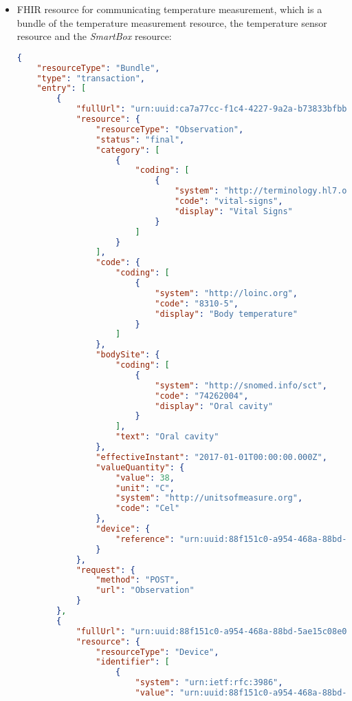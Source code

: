 \begin{itemize}
    \item \acs{FHIR} resource for communicating temperature measurement, which is a bundle of the temperature measurement resource, the temperature sensor resource and the \textit{SmartBox} resource:
    \begin{lstlisting}[language=json]   
{ 
    "resourceType": "Bundle", 
    "type": "transaction", 
    "entry": [ 
        { 
            "fullUrl": "urn:uuid:ca7a77cc-f1c4-4227-9a2a-b73833bfbb11",  
            "resource": { 
                "resourceType": "Observation", 
                "status": "final", 
                "category": [ 
                    { 
                        "coding": [ 
                            { 
                                "system": "http://terminology.hl7.org/CodeSystem/observation-category", 
                                "code": "vital-signs", 
                                "display": "Vital Signs" 
                            } 
                        ] 
                    } 
                ], 
                "code": { 
                    "coding": [ 
                        { 
                            "system": "http://loinc.org", 
                            "code": "8310-5", 
                            "display": "Body temperature" 
                        } 
                    ] 
                }, 
                "bodySite": { 
                    "coding": [ 
                        { 
                            "system": "http://snomed.info/sct", 
                            "code": "74262004", 
                            "display": "Oral cavity" 
                        } 
                    ], 
                    "text": "Oral cavity" 
                }, 
                "effectiveInstant": "2017-01-01T00:00:00.000Z", 
                "valueQuantity": { 
                    "value": 38, 
                    "unit": "C", 
                    "system": "http://unitsofmeasure.org", 
                    "code": "Cel" 
                }, 
                "device": { 
                    "reference": "urn:uuid:88f151c0-a954-468a-88bd-5ae15c08e059" 
                } 
            }, 
            "request": { 
                "method": "POST", 
                "url": "Observation" 
            } 
        }, 
        { 
            "fullUrl": "urn:uuid:88f151c0-a954-468a-88bd-5ae15c08e059",  
            "resource": { 
                "resourceType": "Device", 
                "identifier": [ 
                    { 
                        "system": "urn:ietf:rfc:3986", 
                        "value": "urn:uuid:88f151c0-a954-468a-88bd-5ae15c08e059"  

\end{lstlisting}
\end{itemize}
